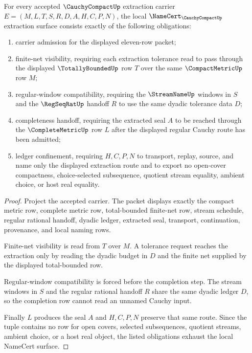 \begin{theorem}
\label{thm:cauchy-compact-extraction-namecert-obligations}
For every accepted $\CauchyCompactUp$ extraction carrier $E=(M,L,T,S,R,D,A,H,C,P,N)$, the local $\NameCert_{\CauchyCompactUp}$ extraction surface consists exactly of the following obligations:
\begin{enumerate}
\item carrier admission for the displayed eleven-row packet;
\item finite-net visibility, requiring each extraction tolerance read to pass through the displayed $\TotallyBoundedUp$ row $T$ over the same $\CompactMetricUp$ row $M$;
\item regular-window compatibility, requiring the $\StreamNameUp$ windows in $S$ and the $\RegSeqRatUp$ handoff $R$ to use the same dyadic tolerance data $D$;
\item completeness handoff, requiring the extracted seal $A$ to be reached through the $\CompleteMetricUp$ row $L$ after the displayed regular Cauchy route has been admitted;
\item ledger confinement, requiring $H,C,P,N$ to transport, replay, source, and name only the displayed extraction route and to export no open-cover compactness, choice-selected subsequence, quotient stream equality, ambient choice, or host real equality.
\end{enumerate}
\end{theorem}

\begin{proof}
Project the accepted carrier. The packet displays exactly the compact metric row, complete metric row, total-bounded finite-net row, stream schedule, regular rational handoff, dyadic ledger, extracted seal, transport, continuation, provenance, and local naming rows.

Finite-net visibility is read from $T$ over $M$. A tolerance request reaches the extraction only by reading the dyadic budget in $D$ and the finite net supplied by the displayed total-bounded row.

Regular-window compatibility is forced before the completion step. The stream windows in $S$ and the regular rational handoff $R$ share the same dyadic ledger $D$, so the completion row cannot read an unnamed Cauchy input.

Finally $L$ produces the seal $A$ and $H,C,P,N$ preserve that same route. Since the tuple contains no row for open covers, selected subsequences, quotient streams, ambient choice, or a host real object, the listed obligations exhaust the local NameCert surface.
\end{proof}

